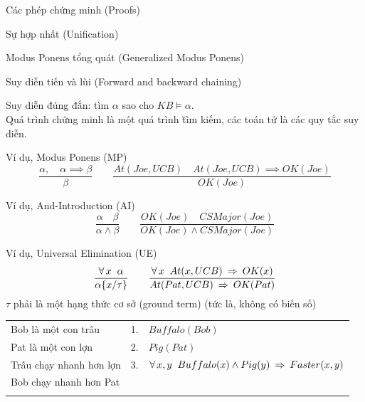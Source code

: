 \documentclass[fleqn]{article}
\begin{document}
\begin{huge}


\blob Các phép chứng minh (Proofs)

\blob Sự hợp nhất (Unification)

\blob Modus Ponens tổng quát (Generalized Modus Ponens)

\blob Suy diễn tiến và lùi (Forward and backward chaining)



Suy diễn đúng đắn: tìm $\alpha$ sao cho $KB \models \alpha$.\\
Quá trình chứng minh là một quá trình \u{tìm kiếm}, các toán tử là các quy tắc suy diễn.

Ví dụ, Modus Ponens (MP)
\[\displaystyle
\frac{\alpha,\quad \alpha\implies\beta}{\beta} \qquad
\frac{At(Joe,UCB)\quad At(Joe,UCB)\implies OK(Joe)}{OK(Joe)}
\]

Ví dụ, And-Introduction (AI)
\[\displaystyle
\frac{\alpha \quad \beta}{\alpha \land \beta} \qquad
\frac{OK(Joe)\quad CSMajor(Joe)}{OK(Joe)\land CSMajor(Joe)}
\]

Ví dụ, Universal Elimination (UE)
\[\displaystyle
\frac{\forall\,x\;\; \alpha}{\alpha\{x/\tau\}} \qquad
\frac{\forall\,x\;\; At(x,UCB)\:\;{\Rightarrow}\:\; OK(x)}{At(Pat,UCB)\:\;{\Rightarrow}\:\; OK(Pat)}
\]
$\tau$ phải là một hạng thức cơ sở (ground term) (tức là, không có biến số)







\begin{tabular}{l|ll}
Bob là một con trâu & 1. & $Buffalo(Bob)$ \\
Pat là một con lợn & 2. & $Pig(Pat)$ \\
Trâu chạy nhanh hơn lợn & 3. & $\forall\,x,y\;\; Buffalo(x) \land Pig(y) \:\;{\Rightarrow}\:\; Faster(x,y)$\\
\hline
Bob chạy nhanh hơn Pat & &\phantom{$Buffalo(Bob) \land Pig(Pat) \implies Faster(Bob,Pat)$}\\
\phantom{UE 3, $\{x/Bob,y/Pat\}$} & & \\
\end{tabular}


\end{huge}
\end{document}
